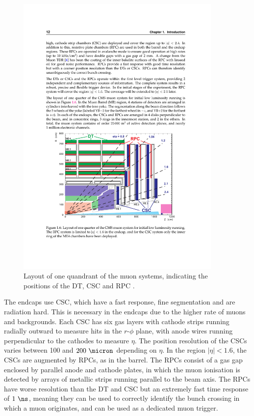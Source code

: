 \begin{figure}[htbp]
   \includegraphics[width=0.9\textwidth]{plots/detector/muon_layout.pdf}
\caption[Layout of one quandrant of the muon systems.]{
    Layout of one quandrant of the muon systems, indicating the positions
of the DT, CSC and RPC \cite{TDR}.}
\label{fig:muondetectors}
\end{figure}

The endcaps use \ac{CSC}, which have a fast response, fine segmentation and are
radiation hard. This is necessary in the endcaps due to the higher rate of muons
and backgrounds. Each \ac{CSC} has six gas layers with cathode strips running
radially outward to measure hits in the $r$-$\phi$ plane, with anode wires
running perpendicular to the cathodes to measure $\eta$. The position resolution
of the \ac{CSC}s varies between 100 and $200~\micron$ depending on $\eta$. In the region
$|\eta|<1.6$, the \ac{CSC}s are augmented by \ac{RPC}s, as in the barrel. The
\ac{RPC}s consist of a gas gap enclosed by parallel anode and cathode plates, in
which the muon ionisation is detected by arrays of metallic strips running
parallel to the beam axis. The \ac{RPC}s have worse resolution than the \ac{DT}
and \ac{CSC} but an extremely fast time response of
$1~\ns$, meaning they can be used to correctly identify the bunch crossing in
which a muon originates, and can be used as a dedicated muon trigger.


